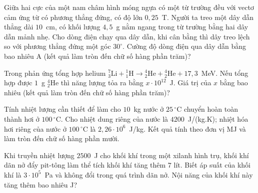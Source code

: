 	\begin{ex}%
		Giữa hai cực của một nam châm hình móng ngựa có một từ trường đều với vectơ cảm ứng từ có phương thẳng đứng, có độ lớn $0{,}25$~T. Người ta treo một dây dẫn thẳng dài $10$~cm, có khối lượng $4{,}5$~g nằm ngang trong từ trường bằng hai dây dẫn mảnh nhẹ. Cho dòng điện chạy qua dây dẫn, khi cân bằng thì dây treo lệch so với phương thẳng đứng một góc $30^\circ$. Cường độ dòng điện qua dây dẫn bằng bao nhiêu A (kết quả làm tròn đến chữ số hàng phần trăm)?
		\par
	\end{ex}

	\begin{ex}%
		Trong phản ứng tổng hợp helium ${}^7_3\text{Li}+{}^1_1\text{H}\to{}^4_2\text{He}+{}^4_2\text{He}+17{,}3$~MeV. Nếu tổng hợp được $1$~g ${}^4_2\text{He}$ thì năng lượng tỏa ra bằng $x\cdot 10^{12}$~J. Giá trị của $x$ bằng bao nhiêu (kết quả làm tròn đến chữ số hàng phần trăm)?
		\par
	\end{ex}

	\begin{ex}%
		Tính nhiệt lượng cần thiết để làm cho $10$~kg nước ở $25\,^\circ\text{C}$ chuyển hoàn toàn thành hơi ở $100\,^\circ\text{C}$. Cho nhiệt dung riêng của nước là $4200$~J/(kg.K); nhiệt hóa hơi riêng của nước ở $100\,^\circ\text{C}$ là $2{,}26\cdot 10^6$~J/kg. Kết quả tính theo đơn vị MJ và làm tròn đến chữ số hàng phần mười.
		\par
	\end{ex}

	\begin{ex}%
		Khi truyền nhiệt lượng $2500$~J cho khối khí trong một xilanh hình trụ, khối khí dãn nở đẩy pit-tông làm thể tích khối khí tăng thêm $7$ lít. Biết áp suất của khối khí là $3\cdot 10^5$~Pa và không đổi trong quá trình dãn nở. Nội năng của khối khí này tăng thêm bao nhiêu J?
		\par
	\end{ex}

